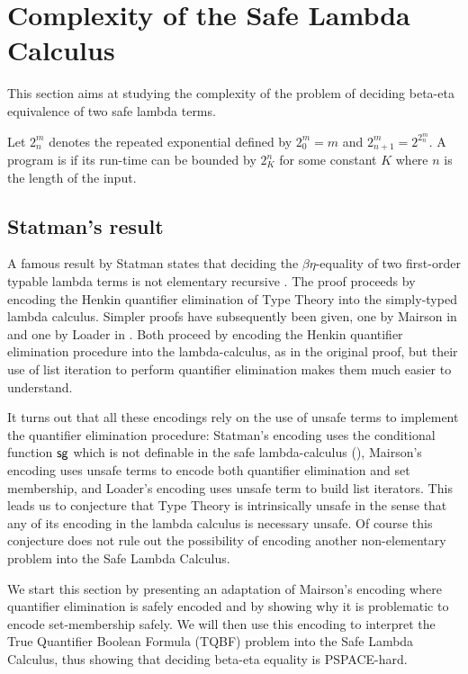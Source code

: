 \newcommand\bigo{\mathcal{O}} %
\newcommand\booltype{\mathsf{B}}

\section{Complexity of the Safe Lambda Calculus}
This section aims at studying the complexity of the problem of deciding beta-eta equivalence of two safe lambda terms.

Let $2_n^m$ denotes the repeated exponential defined by $2_0^m = m$ and $2_{n+1}^m =
2^{2_{n}^m}$. A program is  if its run-time can be bounded by $2_K^n$ for some constant $K$ where $n$ is the length of the input.

\subsection{Statman's result}

A famous result by Statman  states that deciding the
$\beta\eta$-equality of two first-order typable lambda terms is not
elementary recursive \cite{Statman:1979:TLE}. The proof proceeds by
encoding the Henkin quantifier elimination of Type Theory into the
simply-typed lambda calculus. Simpler proofs have subsequently been
given, one by Mairson in \cite{mairson1992spt} and one by Loader in
\cite{Loader1998}. Both proceed by encoding the Henkin quantifier
elimination procedure into the lambda-calculus, as in the original
proof, but their use of list iteration to perform quantifier
elimination makes them much easier to understand.

It turns out that all these encodings rely on the use of unsafe
terms to implement the quantifier elimination procedure: Statman's
encoding uses the conditional function $\sf sg$ which is not
definable in the safe lambda-calculus
(\cite{blumong:safelambdacalculus}), Mairson's encoding uses unsafe
terms to encode both quantifier elimination and set membership, and
Loader's encoding uses unsafe term to build list iterators. This
leads us to conjecture that Type Theory is intrinsically unsafe in
the sense that any of its encoding in the lambda calculus is
necessary unsafe. Of course this conjecture does not rule out the
possibility of encoding another non-elementary problem into the Safe
Lambda Calculus.

We start this section by presenting an adaptation of Mairson's
encoding where quantifier elimination is safely encoded and by
showing why it is problematic to encode set-membership safely. We
will then use this encoding to interpret the True Quantifier Boolean
Formula (TQBF) problem into the Safe Lambda Calculus, thus showing
that deciding beta-eta equality is PSPACE-hard.

